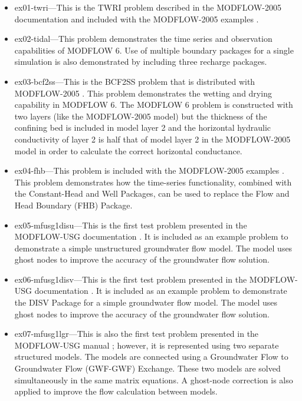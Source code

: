 \begin{itemize}
\item ex01-twri---This is the TWRI problem described in the MODFLOW-2005 documentation and included with the MODFLOW-2005 examples \citep{modflow2005}. 

\item ex02-tidal---This problem demonstrates the time series and observation capabilities of MODFLOW 6.  Use of multiple boundary packages for a single simulation is also demonstrated by including three recharge packages.

\item ex03-bcf2ss---This is the BCF2SS problem that is distributed with MODFLOW-2005 \citep{modflow2005}.  This problem demonstrates the wetting and drying capability in MODFLOW 6. The MODFLOW 6 problem is constructed with two layers (like the MODFLOW-2005 model) but the thickness of the confining bed is included in model layer 2 and the horizontal hydraulic conductivity of layer 2 is half that of model layer 2 in the MODFLOW-2005 model in order to calculate the correct horizontal conductance.

\item ex04-fhb---This problem is included with the MODFLOW-2005 examples \citep{modflow2005}. This problem demonstrates how the time-series functionality, combined with the Constant-Head and Well Packages, can be used to replace the Flow and Head Boundary (FHB) Package.

\item ex05-mfusg1disu---This is the first test problem presented in the MODFLOW-USG documentation \citep{modflowusg}.  It is included as an example problem to demonstrate a simple unstructured groundwater flow model.  The model uses ghost nodes to improve the accuracy of the groundwater flow solution.

\item ex06-mfusg1disv---This is the first test problem presented in the MODFLOW-USG documentation \citep{modflowusg}.  It is included as an example problem to demonstrate the DISV Package for a simple groundwater flow model.  The model uses ghost nodes to improve the accuracy of the groundwater flow solution.

\item ex07-mfusg1lgr---This is also the first test problem presented in the MODFLOW-USG manual \citep{modflowusg}; however, it is represented using two separate structured models.  The models are connected using a Groundwater Flow to Groundwater Flow (GWF-GWF) Exchange.  These two models are solved simultaneously in the same matrix equations.  A ghost-node correction is also applied to improve the flow calculation between models.


\end{itemize}
